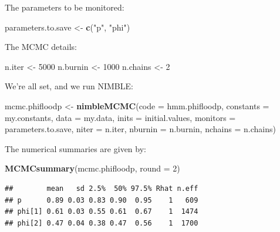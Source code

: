 \documentclass[
  12pt,
]{krantz}
\newenvironment{Shaded}{\begin{snugshade}}{\end{snugshade}}
\newcommand{\AttributeTok}[1]{\textcolor[rgb]{0.13,0.29,0.53}{#1}}
\newcommand{\DecValTok}[1]{\textcolor[rgb]{0.00,0.00,0.81}{#1}}
\newcommand{\FunctionTok}[1]{\textcolor[rgb]{0.13,0.29,0.53}{\textbf{#1}}}
\newcommand{\NormalTok}[1]{#1}
\newcommand{\OtherTok}[1]{\textcolor[rgb]{0.56,0.35,0.01}{#1}}
\newcommand{\StringTok}[1]{\textcolor[rgb]{0.31,0.60,0.02}{#1}}
\begin{document}
The parameters to be monitored:

\begin{Shaded}
\begin{Highlighting}[]
\NormalTok{parameters.to.save }\OtherTok{\textless{}{-}} \FunctionTok{c}\NormalTok{(}\StringTok{"p"}\NormalTok{, }\StringTok{"phi"}\NormalTok{)}
\end{Highlighting}
\end{Shaded}

The MCMC details:

\begin{Shaded}
\begin{Highlighting}[]
\NormalTok{n.iter }\OtherTok{\textless{}{-}} \DecValTok{5000}
\NormalTok{n.burnin }\OtherTok{\textless{}{-}} \DecValTok{1000}
\NormalTok{n.chains }\OtherTok{\textless{}{-}} \DecValTok{2}
\end{Highlighting}
\end{Shaded}

We're all set, and we run NIMBLE:

\begin{Shaded}
\begin{Highlighting}[]
\NormalTok{mcmc.phifloodp }\OtherTok{\textless{}{-}} \FunctionTok{nimbleMCMC}\NormalTok{(}\AttributeTok{code =}\NormalTok{ hmm.phifloodp, }
                             \AttributeTok{constants =}\NormalTok{ my.constants,}
                             \AttributeTok{data =}\NormalTok{ my.data,              }
                             \AttributeTok{inits =}\NormalTok{ initial.values,}
                             \AttributeTok{monitors =}\NormalTok{ parameters.to.save,}
                             \AttributeTok{niter =}\NormalTok{ n.iter,}
                             \AttributeTok{nburnin =}\NormalTok{ n.burnin, }
                             \AttributeTok{nchains =}\NormalTok{ n.chains)}
\end{Highlighting}
\end{Shaded}

The numerical summaries are given by:

\begin{Shaded}
\begin{Highlighting}[]
\FunctionTok{MCMCsummary}\NormalTok{(mcmc.phifloodp, }\AttributeTok{round =} \DecValTok{2}\NormalTok{)}
\end{Highlighting}
\end{Shaded}

\begin{verbatim}
##        mean   sd 2.5%  50% 97.5% Rhat n.eff
## p      0.89 0.03 0.83 0.90  0.95    1   609
## phi[1] 0.61 0.03 0.55 0.61  0.67    1  1474
## phi[2] 0.47 0.04 0.38 0.47  0.56    1  1700
\end{verbatim}
\end{document}
